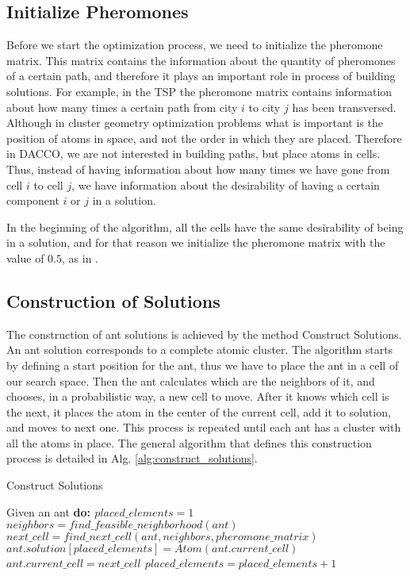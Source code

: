 	\subsection{Initialize Pheromones}
	Before we start the optimization process, we need to initialize the pheromone matrix. This matrix contains the information about the quantity of pheromones of a certain path, and therefore it plays an important role in process of building solutions. For example, in the TSP the pheromone matrix contains information about how many times a certain path from city $i$ to city $j$ has been transversed.\\
	Although in cluster geometry optimization problems what is important is the position of atoms in space, and not the order in which they are placed. Therefore in DACCO, we are not interested in building paths, but place atoms in cells. Thus, instead of having information about how many times we have gone from cell $i$ to cell $j$, we have information about the desirability of having a certain component $i$ or $j$ in a solution.
	
	In the beginning of the algorithm, all the cells have the same desirability of being in a solution, and for that reason we initialize the pheromone matrix with the value of $0.5$, as in \cite{blum04}.
	
	
	\subsection{Construction of Solutions}
	The construction of ant solutions is achieved by the method Construct Solutions. An ant solution corresponds to a complete atomic cluster. The algorithm starts by defining a start position for the ant, thus we have to place the ant in a cell of our search space. Then the ant calculates which are the neighbors of it, and chooses, in a probabilistic way, a new cell to move. After it knows which cell is the next, it places the atom in the center of the current cell, add it to solution, and moves to next one. This process is repeated until each ant has a cluster with all the atoms in place. The general algorithm that defines this construction process is detailed in Alg. \ref{alg:construct_solutions}.
	
	\begin{algorithm}
		\caption{Construct Solutions}
		\label{alg:construct_solutions}
		\begin{algorithmic}
		\STATE Given an ant \bf{do}:
		\STATE $placed\_elements = 1$
			\STATE $neighbors = find\_feasible\_neighborhood(ant)$
			\STATE $next\_cell = find\_next\_cell(ant, neighbors, pheromone\_matrix)$
			\STATE $ant.solution[placed\_elements] = Atom(ant.current\_cell)$
			\STATE $ant.current\_cell = next\_cell$
			\STATE $placed\_elements = placed\_elements + 1$			
		\ENDWHILE
		\end{algorithmic}
	\end{algorithm}
	
